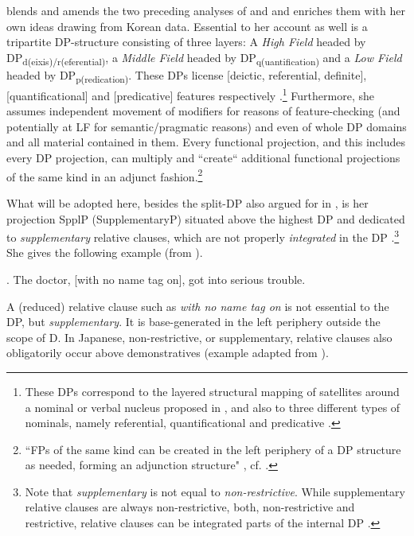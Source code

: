 \documentclass [output=book,colorlinks,citecolor=brown]{langscibook}
\begin{document}
\citet{kim:2019:syntax} blends and amends the two preceding analyses of \citet{svenonius:2008:position} and \citet{laenzlinger:2005:french} and enriches them with her own ideas drawing from Korean data. Essential to her account as well is a tripartite DP-structure consisting of three layers: A \textit{High Field} headed by DP\textsubscript{d(eixis)/r(eferential)}, a \textit{Middle Field} headed by DP\textsubscript{q(uantification)} and a \textit{Low Field} headed by DP\textsubscript{p(redication)}. These DPs license [deictic, referential, definite], [quantificational] and [predicative] features respectively \citep[123]{kim:2019:syntax}.\footnote{These DPs correspond to the layered structural mapping of satellites around a nominal or verbal nucleus proposed in \citet[218]{rijkhoff:2002:noun}, and also to three different types of nominals, namely referential, quantificational and predicative \citep[114]{kim:2019:syntax}.} Furthermore, she assumes independent movement of modifiers for reasons of feature-checking (and potentially at LF for semantic/pragmatic reasons) and even of whole DP domains and all material contained in them. Every functional projection, and this includes every DP projection, can multiply and ``create“ additional functional projections of the same kind in an adjunct fashion.\footnote{``FPs of the same kind can be created in the left periphery of a DP structure as needed, forming an adjunction structure" \citep[121]{kim:2019:syntax}, cf. \citet{koopman:2000:verbal}.} %

What will be adopted here, besides the split-DP also argued for in \citet{laenzlinger:2005:french, laenzlinger:2011:elements}, is her projection SpplP (SupplementaryP) situated above the highest DP and dedicated to \textit{supplementary} relative clauses, which are not properly \textit{integrated} in the DP \citep[116–119]{kim:2019:syntax}.\footnote{Note that \textit{supplementary} is not equal to \textit{non-restrictive}. While supplementary relative clauses are always non-restrictive, both, non-restrictive and restrictive, relative clauses can be integrated parts of the internal DP \citep[120]{kim:2019:syntax}.} She gives the following example (from \citealt{huddleston:2005:student}). %

\ex. The doctor, [with no name tag on], got into serious trouble. \\ \null \hfill \citep[117]{kim:2019:syntax}

A (reduced) relative clause such as \textit{with no name tag on} is not essential to the DP, but \textit{supplementary}. It is base-generated in the left periphery outside the scope of D. In Japanese, non-restrictive, or supplementary, relative clauses also obligatorily occur above demonstratives (example adapted from \citealt[7–8]{ishizuka:2008:RC}). %
\end{document}
